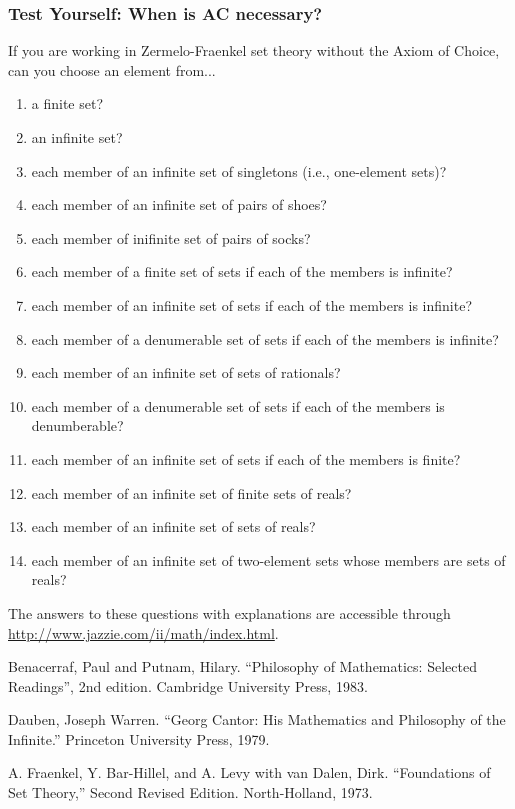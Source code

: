 \subsubsection{Test Yourself: When is AC necessary?}

If you are working in Zermelo-Fraenkel set theory without the Axiom of
Choice, can you choose an element from...
\begin{enumerate}
  \item a finite set?
  \item an infinite set?
  \item each member of an infinite set of singletons (i.e., one-element
  sets)?
  \item each member of an infinite set of pairs of shoes?
  \item each member of inifinite set of pairs of socks?
  \item each member of a finite set of sets if each of the members is
  infinite?
  \item each member of an infinite set of sets if each of the members is
  infinite?
  \item each member of a denumerable set of sets if each of the members
  is infinite?
  \item each member of an infinite set of sets of rationals?
  \item each member of a denumerable set of sets if each of the members
  is denumberable?
  \item each member of an infinite set of sets if each of the members is
  finite?
  \item each member of an infinite set of finite sets of reals?
  \item each member of an infinite set of sets of reals?
  \item each member of an infinite set of two-element sets whose members
  are sets of reals?
\end{enumerate}
The answers to these questions with explanations are accessible through
\url{http://www.jazzie.com/ii/math/index.html}.

\Ref

Benacerraf, Paul and Putnam, Hilary.  ``Philosophy of Mathematics:
Selected Readings'', 2nd edition. Cambridge University Press, 1983.

Dauben, Joseph Warren.  ``Georg Cantor: His Mathematics and Philosophy
of the Infinite.''  Princeton University Press, 1979.

A. Fraenkel, Y.  Bar-Hillel, and A. Levy with van Dalen, Dirk.
``Foundations of Set Theory,'' Second Revised Edition.  North-Holland,
1973.

